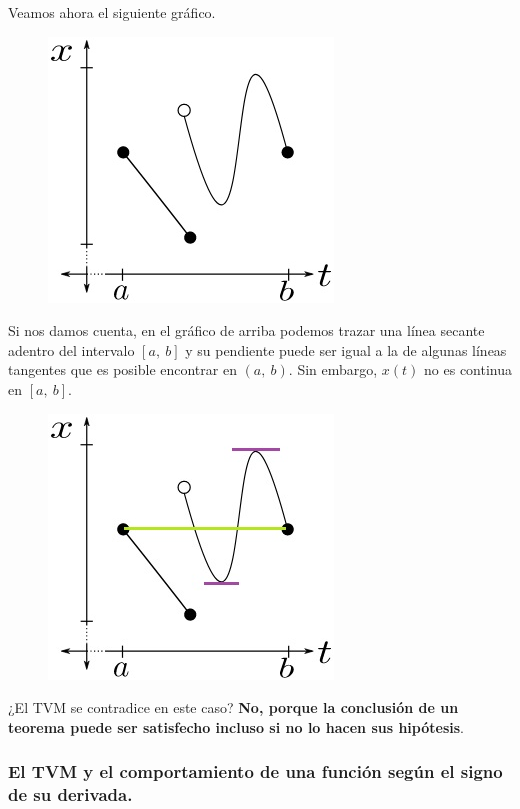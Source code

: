 \documentclass[12pt]{article}
\begin{document}
Veamos ahora el siguiente gráfico.

\begin{figure}[hbt!]
\centering
\includegraphics[scale=0.5]{img/mean-value-theo-4.jpg}
\end{figure}

Si nos damos cuenta, en el gráfico de arriba podemos trazar una línea secante adentro del intervalo $[a, \ b]$ y su pendiente puede ser igual a la de algunas líneas tangentes que es posible encontrar en $(a, \ b)$. Sin embargo, $x(t)$ no es continua en $[a, \ b]$.

\begin{figure}[hbt!]
\centering
\includegraphics[scale=0.5]{img/mean-value-theo-5.jpg}
\end{figure}

¿El TVM se contradice en este caso? \textbf{No, porque la conclusión de un teorema puede ser satisfecho incluso si no lo hacen sus hipótesis}.

\newpage

\subsubsection{El TVM y el comportamiento de una función según el signo de su derivada.}
\end{document}
